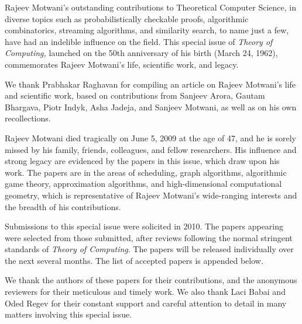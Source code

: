 \documentclass{tocforeword}
\begin{document}
\begin{frontmatter}
\author[khuller]{Samir Khuller}
\author[guha]{Sudipto Guha}



\end{frontmatter}

Rajeev Motwani's outstanding contributions to Theoretical Computer
Science, in diverse topics such as probabilistically checkable
proofs, algorithmic combinatorics, streaming algorithms, and
similarity search, to name just a few, have had an indelible
influence on the field.
This special issue of \emph{Theory of Computing,}
launched on the 50th anniversary of his birth (March 24, 1962),  %
commemorates Rajeev Motwani's life, scientific work, and legacy.

We thank Prabhakar Raghavan for compiling an article on Rajeev
Motwani's life and scientific work, based on contributions from
Sanjeev Arora, Gautam Bhargava, Piotr Indyk, Asha Jadeja, and Sanjeev
Motwani, as well as on his own recollections.

Rajeev Motwani died tragically on June 5, 2009 at the age of 47, and
he is sorely missed by his family, friends, colleagues, and fellow
researchers.
His influence and strong legacy are evidenced by the papers
in this issue, which draw upon his work.
The papers are in the areas of scheduling, graph algorithms, 
algorithmic game theory, approximation algorithms, and
high-dimensional computational geometry, which is representative of
Rajeev Motwani's wide-ranging interests and the breadth of his
contributions.

Submissions to this special issue were solicited in 2010.
The papers appearing were selected from those submitted, after
reviews following the normal stringent standards of
\emph{Theory of Computing}.
The papers will be released individually over the next several months.
The list of accepted papers is appended below.

We thank the authors of these papers for their contributions, and 
the anonymous reviewers for their meticulous and timely work.
We also thank Laci Babai and Oded Regev for their constant support
and careful attention to detail in many matters involving this special
issue.
\end{document}
